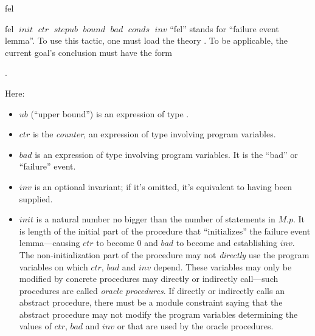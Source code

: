 \begin{tactic}{fel}
  \begin{tsyntax}{fel $\;\mathit{init}$ $\;\mathit{ctr}$ $\;\mathit{stepub}$
                      $\;\mathit{bound}$ $\;\mathit{bad}$ $\;\mathit{conds}$
                      $\;\mathit{inv}$}
    ``fel'' stands for ``failure event lemma''. To use this tactic,
    one must load the theory . To be applicable, the
    current goal's conclusion must have the form
    \begin{center}
      .
    \end{center}
    Here:
    \begin{itemize}
    \item $\mathit{ub}$ (``upper bound'') is an expression of type .

    \item $\mathit{ctr}$ is the \emph{counter}, an expression of
      type  involving program variables.

    \item $\mathit{bad}$ is an expression of type  involving
      program variables. It is the ``bad'' or ``failure'' event.

    \item $\mathit{inv}$ is an optional invariant; if it's omitted,
      it's equivalent to  having been supplied.

    \item $\mathit{init}$ is a natural number no bigger than the
      number of statements in $M$.$p$. It is length of the initial
      part of the procedure that ``initializes'' the failure event
      lemma---causing $\mathit{ctr}$ to become $0$ and $\mathit{bad}$
      to become  and establishing $\mathit{inv}$.  The
      non-initialization part of the procedure may not \emph{directly}
      use the program variables on which $\mathit{ctr}$,
      $\mathit{bad}$ and $\mathit{inv}$ depend. These variables may
      only be modified by concrete procedures  may
      directly or indirectly call---such procedures are called
      \emph{oracle procedures}.  If  directly or
      indirectly calls an abstract procedure, there must be a module
      constraint saying that the abstract procedure may not modify the
      program variables determining the values of $\mathit{ctr}$,
      $\mathit{bad}$ and $\mathit{inv}$ or that are used by the oracle
      procedures.


\end{itemize}
\end{tsyntax}
\end{tactic}
